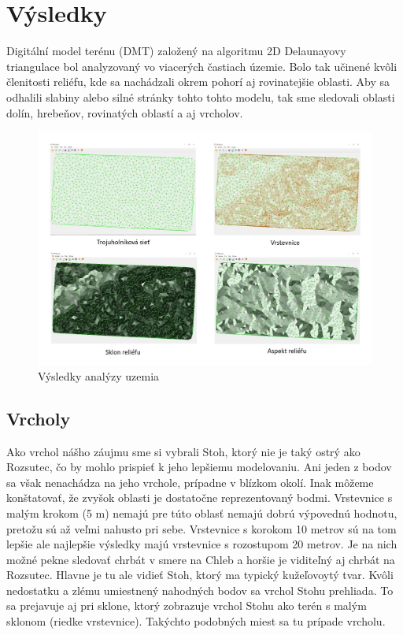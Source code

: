 \documentclass[12pt]{article}
\begin{document}
\section*{Výsledky}
Digitální model terénu (DMT) založený na algoritmu 2D Delaunayovy triangulace bol analyzovaný vo viacerých častiach územie. Bolo tak učinené kvôli členitosti reliéfu, kde sa nachádzali okrem pohorí aj rovinatejšie oblasti. Aby sa odhalili slabiny alebo silné stránky tohto tohto modelu, tak sme sledovali oblasti dolín, hrebeňov, rovinatých oblastí a aj vrcholov. 
\begin{figure}[h]
    \centering
    \includegraphics[width=1\linewidth]{latex/images/vysledky.jpg}
    \caption{Výsledky analýzy uzemia}
    \label{fig:enter-label}
\end{figure}
\newpage
\subsection*{Vrcholy}
Ako vrchol nášho záujmu sme si vybrali Stoh, ktorý nie je taký ostrý ako Rozsutec, čo by mohlo prispieť k jeho lepšiemu modelovaniu. Ani jeden z bodov sa však nenachádza na jeho vrchole, prípadne v blízkom okolí. Inak môžeme konštatovať, že zvyšok oblasti je dostatočne reprezentovaný bodmi. Vrstevnice s malým krokom (5 m) nemajú pre túto oblasť nemajú dobrú výpovednú hodnotu, pretožu sú až veľmi nahusto pri sebe. Vrstevnice s korokom 10 metrov sú na tom lepšie ale najlepšie výsledky majú vrstevnice s rozostupom 20 metrov. Je na nich možné pekne sledovať chrbát v smere na Chleb a horšie je viditeľný aj chrbát na Rozsutec. Hlavne je tu ale vidieť Stoh, ktorý ma typický kužeľovoytý tvar. Kvôli nedostatku a zlému umiestnený nahodných bodov sa vrchol Stohu prehliada. To sa prejavuje aj pri sklone, ktorý zobrazuje vrchol Stohu ako terén s malým sklonom (riedke vrstevnice). Takýchto podobných miest sa tu prípade vrcholu.
\end{document}
